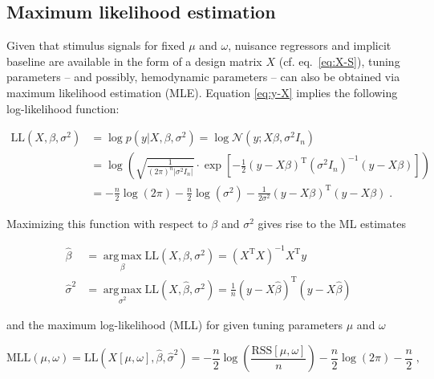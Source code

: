 \documentclass[a4paper,12pt]{article}
\begin{document}
\pagebreak
\subsection{Maximum likelihood estimation}

Given that stimulus signals for fixed $\mu$ and $\omega$, nuisance regressors and implicit baseline are available in the form of a design matrix $X$ (cf. eq.~\ref{eq:X-S}), tuning parameters -- and possibly, hemodynamic parameters -- can also be obtained via maximum likelihood estimation (MLE). Equation \eqref{eq:y-X} implies the following log-likelihood function:

\begin{equation} \label{eq:LLF}
\begin{split}
\mathrm{LL}(X,\beta,\sigma^2) &= \log p(y|X,\beta,\sigma^2) = \log \mathcal{N}(y; X\beta, \sigma^2 I_n) \\
&= \log \left( \sqrt{\frac{1}{(2\pi)^n |\sigma^2 I_n|}} \cdot \exp\left[ -\frac{1}{2} (y - X\beta)^\mathrm{T} (\sigma^2 I_n)^{-1} (y - X\beta) \right] \right) \\
&= - \frac{n}{2} \log(2\pi) - \frac{n}{2} \log (\sigma^2) - \frac{1}{2 \sigma^2} (y - X\beta)^\mathrm{T} (y - X\beta) \; .
\end{split}
\end{equation}

Maximizing this function with respect to $\beta$ and $\sigma^2$ gives rise to the ML estimates

\vspace{-0.5em}
\begin{equation} \label{eq:MLE}
\begin{split}
\hat{\beta} &= \operatorname*{arg\,max}_{\beta} \mathrm{LL}(X,\beta,\sigma^2) = (X^\mathrm{T} X)^{-1} X^\mathrm{T} y \\
\hat{\sigma}^2 &= \operatorname*{arg\,max}_{\sigma^2} \mathrm{LL}(X,\hat{\beta},\sigma^2) = \frac{1}{n} (y-X\hat{\beta})^\mathrm{T} (y-X\hat{\beta})
\end{split}
\end{equation}

and the maximum log-likelihood (MLL) for given tuning parameters $\mu$ and $\omega$

\begin{equation} \label{eq:MLL}
\mathrm{MLL}(\mu,\omega) = \mathrm{LL}(X[\mu,\omega],\hat{\beta},\hat{\sigma}^2) = - \frac{n}{2} \log\left( \frac{\mathrm{RSS}\left[ \mu, \omega \right]}{n} \right) - \frac{n}{2} \log(2\pi) - \frac{n}{2} \; ,
\end{equation}
\end{document}
